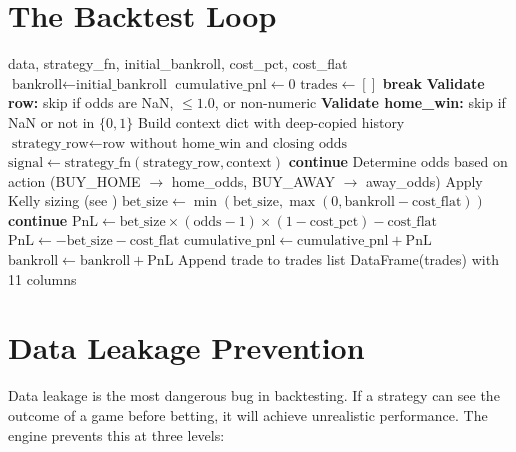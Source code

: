 \documentclass[12pt,a4paper]{report}
\theoremstyle{definition}
\newcommand{\pnl}{\text{PnL}}
\begin{document}
\section{The Backtest Loop}
\label{sec:backtest-loop}

\begin{algorithm}[H]
\caption{Core Backtest Loop}
\label{alg:backtest}
\begin{algorithmic}[1]
\Require data, strategy\_fn, initial\_bankroll, cost\_pct, cost\_flat
\State $\text{bankroll} \gets \text{initial\_bankroll}$
\State $\text{cumulative\_pnl} \gets 0$
\State $\text{trades} \gets []$
        \State \textbf{break}  
    \EndIf
    \State \textbf{Validate row:} skip if odds are NaN, $\leq 1.0$, or non-numeric
    \State \textbf{Validate home\_win:} skip if NaN or not in $\{0, 1\}$
    \State Build context dict with deep-copied history
    \State $\text{strategy\_row} \gets \text{row without home\_win and closing odds}$
    \State $\text{signal} \gets \text{strategy\_fn}(\text{strategy\_row}, \text{context})$
        \State \textbf{continue}
    \EndIf
    \State Determine odds based on action (BUY\_HOME $\to$ home\_odds, BUY\_AWAY $\to$ away\_odds)
        \State Apply Kelly sizing (see )
    \EndIf
    \State $\text{bet\_size} \gets \min(\text{bet\_size}, \max(0, \text{bankroll} - \text{cost\_flat}))$
        \State \textbf{continue}
    \EndIf
        \State $\pnl \gets \text{bet\_size} \times (\text{odds} - 1) \times (1 - \text{cost\_pct}) - \text{cost\_flat}$
    \Else
        \State $\pnl \gets -\text{bet\_size} - \text{cost\_flat}$
    \EndIf
    \State $\text{cumulative\_pnl} \gets \text{cumulative\_pnl} + \pnl$
    \State $\text{bankroll} \gets \text{bankroll} + \pnl$
    \State Append trade to trades list
\EndFor
\State \Return DataFrame(trades) with 11 columns
\end{algorithmic}
\end{algorithm}

\section{Data Leakage Prevention}
\label{sec:leakage-prevention}

Data leakage is the most dangerous bug in backtesting. If a strategy can see the outcome of a game before betting, it will achieve unrealistic performance. The engine prevents this at three levels:
\end{document}

